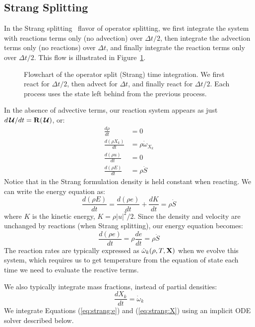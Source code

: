 \documentclass[linenumbers,trackchanges]{aastex631}
\newcommand{\omegadot}{\dot{\omega}}
\newcommand{\Sdot}{\dot{S}}
\newcommand{\odt}[1]{{\frac{{d#1}}{dt}}}
\newcommand{\Uc}{{\,\bm{\mathcal{U}}}}
\newcommand{\Rb}{{\bf R}}
\begin{document}
\subsection{Strang Splitting}

In the Strang splitting~\citep{strang:1968} flavor of operator
splitting, we first integrate the system with reactions terms only (no
advection) over $\Delta t/2$, then integrate the advection terms only
(no reactions) over $\Delta t$, and finally integrate the reaction
terms only over $\Delta t/2$.    This flow is illustrated in
Figure~\ref{fig:strang_flowchart}.

\begin{figure}[t]
  \caption{\label{fig:strang_flowchart} Flowchart of the operator split (Strang) time integration.  We first react for $\Delta t/2$, then
    advect for $\Delta t$, and finally react for $\Delta t/2$.  Each
    process uses the state left behind from the previous process.}
  \end{figure}


In the absence of advective terms, our reaction system appears as just
$d\Uc/dt = \Rb(\Uc)$, or:
\begin{align}
\odt{\rho} & = 0 \\
\odt{(\rho X_k)} &= \rho \dot\omega_{X_k} \\
\odt{(\rho u)} &= 0 \\
\odt{(\rho E)} &= \rho \Sdot
\end{align}
Notice that in the Strang formulation density is held constant when reacting.
We can write the energy equation as:
\begin{equation}
\odt{(\rho E)} = \odt{(\rho e)} + \odt{K} = \rho \Sdot
\end{equation}
where $K$ is the kinetic energy, $K = \rho |u|^2/2$.  Since the density and velocity
are unchanged by reactions (when Strang splitting), our energy equation becomes:
\begin{equation}
\label{eq:strang:e}
\odt{(\rho e)} = \rho \odt{e} = \rho \Sdot
\end{equation}
The reaction rates are typically expressed as $\omegadot_k(\rho, T, {\bf X})$
when we evolve this system, which requires us to get temperature from
the equation of state each
time we need to evaluate the reactive terms.

We also typically integrate mass fractions, instead of partial
densities:
\begin{equation}
\label{eq:strang:X}
\odt{X_k} = \omegadot_k
\end{equation}
We integrate Equations (\ref{eq:strang:e}) and (\ref{eq:strang:X})
using an implicit ODE solver described below.
\end{document}
